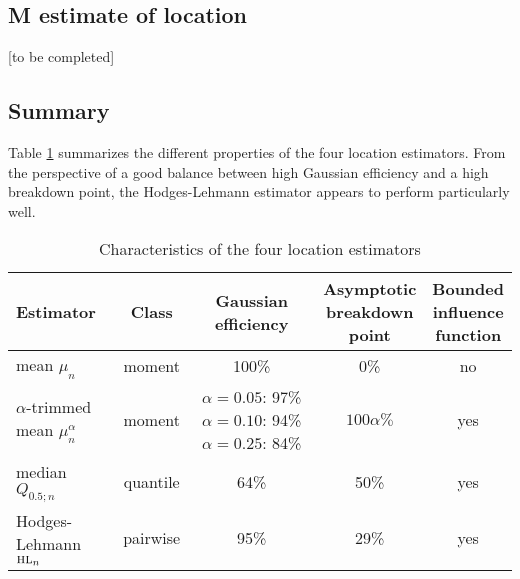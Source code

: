 
\subsection{M estimate of location}

\alert{[to be completed]}

\subsection{Summary}


Table \ref{tab:stat:location} summarizes the different properties of the four
location estimators. From the perspective of a good balance between high
Gaussian efficiency and a high breakdown point, the Hodges-Lehmann estimator
appears to perform particularly well.

\begin{table}[h!]
    \centering
    \caption{Characteristics of the four location estimators}
    \label{tab:stat:location}
    \begin{tabular}{lcccc}
        \toprule
        Estimator
        & Class  
        & \subtab{c}{Gaussian\\ efficiency}
        & \subtab{c}{Asymptotic\\ breakdown\\ point} 
        & \subtab{c}{Bounded\\ influence\\ function}
        \\\midrule
        mean $\mu_n$                            & moment   & 100\% &  0\%          & no
        \\\addlinespace
        $\alpha$-trimmed mean $\mu_n^{\alpha}$  & moment   & 
            \subtab{l}{$\alpha=0.05$: 97\%\\ $\alpha=0.10$: 94\%\\ $\alpha=0.25$: 84\%} 
                                                                   & $100\alpha\%$ & yes
        \\\addlinespace
        median $Q_{0.5;n}$                      & quantile & 64\%  & 50\%          & yes
        \\\addlinespace
        Hodges-Lehmann $\stsc{HL}_n$            & pairwise & 95\%  & 29\%          & yes
        \\\bottomrule
    \end{tabular}
\end{table}


